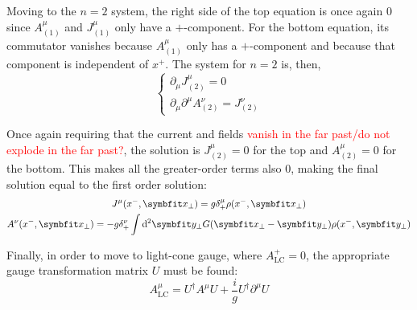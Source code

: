 Moving to the $n=2$ system, the right side of the top equation is once again $0$ since $A_{(1)}^\mu$ and $J_{(1)}^{\mu}$ only have a $+$-component. For the bottom equation, its commutator vanishes because $A_{(1)}^\mu$ only has a $+$-component and because that component is independent of $x^+$. The system for $n=2$ is, then,
\begin{equation}
	\begin{cases}
		\partial_\mu J_{(2)}^\mu = 0  \\
		\partial_\mu \partial^\mu A_{(2)}^\nu = J_{(2)}^\nu
	\end{cases}
\end{equation}

Once again requiring that the current and fields  \textcolor{red}{vanish in the far past/do not explode in the far past?}, the solution is $J_{(2)}^\mu = 0$ for the top and $A_{(2)}^\mu =0$ for the bottom. This makes all the greater-order terms also $0$, making the final solution equal to the first order solution:
\begin{subequations}
	\begin{gather}
		J^\mu(x^-,\mathbf{x}_\perp) = g \delta^{\mu}_+ \rho(x^-,\mathbf{x}_\perp) \\
		A^\nu(x^-,\mathbf{x}_\perp) = - g \delta^{\nu}_+  \int \diff^2 \mathbf{y}_\perp G(\mathbf{x_\perp} - \mathbf{y_\perp}) \rho(x^-,\mathbf{y}_\perp)
	\end{gather}
\end{subequations}

Finally, in order to move to light-cone gauge, where $A_\text{LC}^+=0$, the appropriate gauge transformation matrix $U$ must be found:
\begin{equation}
	A^\mu_\text{LC} = U^\dagger A^\mu U + \frac{i}{g} U^\dagger \partial^\mu U
	\label{eq:gauge_transformation}
\end{equation}

